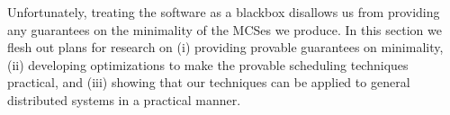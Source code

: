 Unfortunately, treating the software as a blackbox disallows us from
providing any guarantees on the minimality of the MCSes we produce.
In this section we flesh out plans for research on
(i) providing provable guarantees on minimality, (ii) developing optimizations
to make the provable scheduling techniques practical, and (iii) showing
that our techniques can be applied to general distributed systems in a
practical manner.




